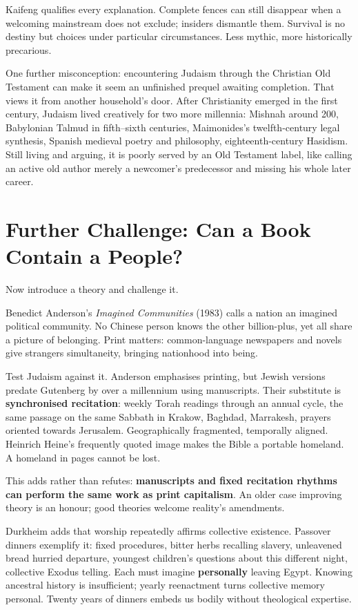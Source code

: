 Kaifeng qualifies every explanation. Complete fences can still disappear when a welcoming mainstream does not exclude; insiders dismantle them. Survival is no destiny but choices under particular circumstances. Less mythic, more historically precarious.

One further misconception: encountering Judaism through the Christian Old Testament can make it seem an unfinished prequel awaiting completion. That views it from another household's door. After Christianity emerged in the first century, Judaism lived creatively for two more millennia: Mishnah around 200, Babylonian Talmud in fifth--sixth centuries, Maimonides's twelfth-century legal synthesis, Spanish medieval poetry and philosophy, eighteenth-century Hasidism. Still living and arguing, it is poorly served by an Old Testament label, like calling an active old author merely a newcomer's predecessor and missing his whole later career.

\section[Further Challenge: A People in a Book]{Further Challenge: Can a Book Contain a People?}
Now introduce a theory and challenge it.

Benedict Anderson's \textit{Imagined Communities} (1983) calls a nation an imagined political community. No Chinese person knows the other billion-plus, yet all share a picture of belonging. Print matters: common-language newspapers and novels give strangers simultaneity, bringing nationhood into being.

Test Judaism against it. Anderson emphasises printing, but Jewish versions predate Gutenberg by over a millennium using manuscripts. Their substitute is \textbf{synchronised recitation}: weekly Torah readings through an annual cycle, the same passage on the same Sabbath in Krakow, Baghdad, Marrakesh, prayers oriented towards Jerusalem. Geographically fragmented, temporally aligned. Heinrich Heine's frequently quoted image makes the Bible a portable homeland. A homeland in pages cannot be lost.

This adds rather than refutes: \textbf{manuscripts and fixed recitation rhythms can perform the same work as print capitalism}. An older case improving theory is an honour; good theories welcome reality's amendments.

Durkheim adds that worship repeatedly affirms collective existence. Passover dinners exemplify it: fixed procedures, bitter herbs recalling slavery, unleavened bread hurried departure, youngest children's questions about this different night, collective Exodus telling. Each must imagine \textbf{personally} leaving Egypt. Knowing ancestral history is insufficient; yearly reenactment turns collective memory personal. Twenty years of dinners embeds us bodily without theological expertise.

